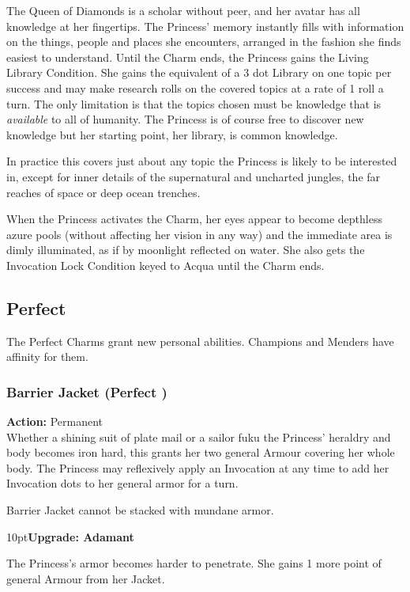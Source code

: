 The Queen of Diamonds is a scholar without peer, and her avatar has all knowledge at her fingertips. The Princess' memory instantly fills with information on the things, people and places she encounters, arranged in the fashion she finds easiest to understand. Until the Charm ends, the Princess gains the Living Library Condition. She gains the equivalent of a 3 dot Library on one topic per success and may make research rolls on the covered topics at a rate of 1 roll a turn. The only limitation is that the topics chosen must be knowledge that is \textit{available} to all of humanity. The Princess is of course free to discover new knowledge but her starting point, her library, is common knowledge. 

In practice this covers just about any topic the Princess is likely to be interested in, except for inner details of the supernatural and uncharted jungles, the far reaches of space or deep ocean trenches. 

When the Princess activates the Charm, her eyes appear to become depthless azure pools (without affecting her vision in any way) and the immediate area is dimly illuminated, as if by moonlight reflected on water. She also gets the Invocation Lock Condition keyed to Acqua until the Charm ends.

\subsection*{Perfect}
\label{subsec:Perfect}
The Perfect Charms grant new personal abilities. Champions and Menders have affinity for them.

\subsubsection*{Barrier Jacket (Perfect \textbullet)}

\noindent \textbf{Action:} Permanent \\

\noindent  Whether a shining suit of plate mail or a sailor fuku the Princess' heraldry and body becomes iron hard, this grants her two general Armour covering her whole body. The Princess may reflexively apply an Invocation at any time to add her Invocation dots to her general armor for a turn. 

Barrier Jacket cannot be stacked with mundane armor.

\begin{myindentpar}{10pt}\textbf{Upgrade: Adamant}

\noindent The Princess's armor becomes harder to penetrate. She gains 1 more point of general Armour from her Jacket. \end{myindentpar}

